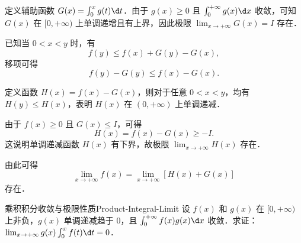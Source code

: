 \begin{myproof}
    定义辅助函数 $G(x) = \int_0^x g(t) \d t$．由于 $g(x) \geqslant 0$ 且 $\int_0^{+\infty} g(x) \d x$ 收敛，可知 $G(x)$ 在 $[0, +\infty)$ 上单调递增且有上界，因此极限 $\lim_{x\to +\infty} G(x) = I$ 存在．

    已知当 $0 < x < y$ 时，有
    \begin{equation}
        f(y) \leqslant f(x) + G(y) - G(x),
    \end{equation}
    移项可得
    \begin{equation}
        f(y) - G(y) \leqslant f(x) - G(x).
    \end{equation}

    定义函数 $H(x) = f(x) - G(x)$，则对于任意 $0 < x < y$，均有 $H(y) \leqslant H(x)$，表明 $H(x)$ 在 $(0, +\infty)$ 上单调递减．

    由于 $f(x) \geqslant 0$ 且 $G(x) \leqslant I$，可得
    \begin{equation}
        H(x) = f(x) - G(x) \geqslant -I.
    \end{equation}
    这说明单调递减函数 $H(x)$ 有下界，故极限 $\lim_{x\to +\infty} H(x)$ 存在．

    由此可得
    \begin{equation}
        \lim_{x\to +\infty} f(x) = \lim_{x\to +\infty} [H(x) + G(x)]
    \end{equation}
    存在．
\end{myproof}

\begin{problem}{乘积积分收敛与极限性质}{Product-Integral-Limit}
    设 $f(x)$ 和 $g(x)$ 在 $[0,+\infty)$ 上非负，$g(x)$ 单调递减趋于 0，且 $\int_0^{+\infty} f(x)g(x) \d x$ 收敛．求证：$\lim_{x\to+\infty} g(x)\int_0^x f(t) \d t = 0$．
\end{problem}

